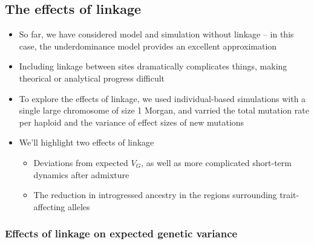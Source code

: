 \documentclass{article}
\begin{document}
\subsection*{The effects of linkage}

\begin{itemize}
    \item So far, we have considered model and simulation without linkage -- in this
        case, the underdominance model provides an excellent approximation
    \item Including linkage between sites dramatically complicates things, making
        theorical or analytical progress difficult
    \item To explore the effects of linkage, we used individual-based simulations
        with a single large chromosome of size 1 Morgan, and varried the total
        mutation rate per haploid and the variance of effect sizes of new mutations
    \item We'll highlight two effects of linkage
        \begin{itemize}
            \item Deviations from expected $V_G$, as well as more complicated
                short-term dynamics after admixture
            \item The reduction in introgressed ancestry in the regions surrounding
                trait-affecting alleles
        \end{itemize}
\end{itemize}

\subsubsection*{Effects of linkage on expected genetic variance}

\begin{figure}[t!]
    \centering
    \caption{}
    \label{fig:linkage-deviations}
\end{figure}
\end{document}
